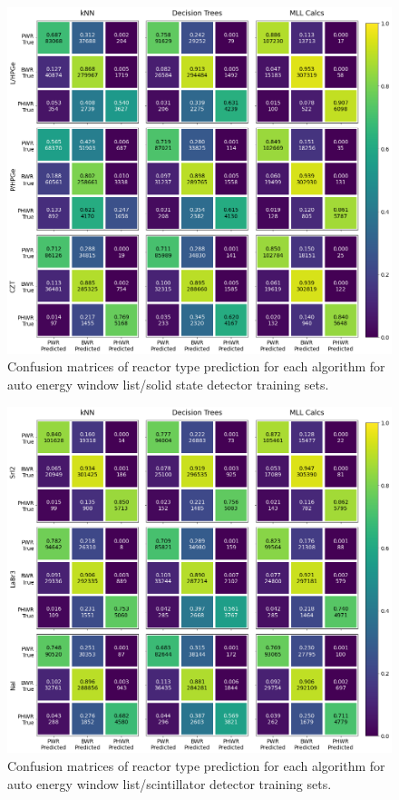 \begin{figure}[!htb]
  \centering
  \includegraphics[width=\textwidth]{./chapters/exp2/confusion_matrix_soliddets_auto.png}
  \caption{Confusion matrices of reactor type prediction for each algorithm 
           for auto energy window list/solid state detector training sets.}
  \label{fig:cm_auto1}
\end{figure}

\begin{figure}[!htb]
  \centering
  \includegraphics[width=\textwidth]{./chapters/exp2/confusion_matrix_scintdets_auto.png}
  \caption{Confusion matrices of reactor type prediction for each algorithm 
           for auto energy window list/scintillator detector training sets.}
  \label{fig:cm_auto2}
\end{figure}

